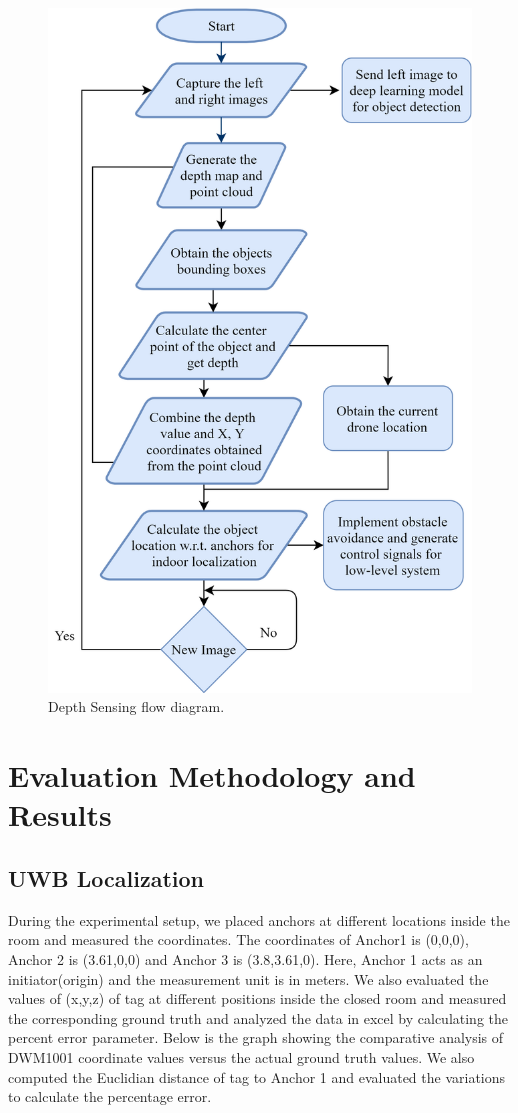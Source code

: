\documentclass{IEEEtran}
\begin{document}
\begin{figure}[htb]
\centering
\includegraphics[width=0.9\linewidth]{fig/flow_depth_sensing.png}
\caption{Depth Sensing flow diagram.} \label{fig.structure}
\end{figure}


\section{Evaluation Methodology and Results}\label{sec:evaluation}

\subsection{UWB Localization}
During the experimental setup, we placed anchors at different locations inside the room and measured the coordinates. The  coordinates of Anchor1 is (0,0,0), Anchor 2 is (3.61,0,0) and Anchor 3 is (3.8,3.61,0). Here, Anchor 1 acts as an initiator(origin) and the measurement unit is in meters. 
\newline We also evaluated the values of (x,y,z) of tag at different positions inside the closed room and measured the corresponding ground truth and analyzed the data in excel by calculating the percent error parameter. Below is the graph showing the comparative analysis of DWM1001 coordinate values versus the actual ground truth values. We also computed the Euclidian distance of tag to Anchor 1 and evaluated the variations to calculate the percentage error.
\end{document}
